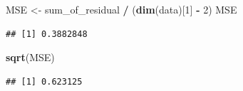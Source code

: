 \documentclass[]{article}
\newenvironment{Shaded}{\begin{snugshade}}{\end{snugshade}}
\newcommand{\KeywordTok}[1]{\textcolor[rgb]{0.13,0.29,0.53}{\textbf{#1}}}
\newcommand{\DecValTok}[1]{\textcolor[rgb]{0.00,0.00,0.81}{#1}}
\newcommand{\StringTok}[1]{\textcolor[rgb]{0.31,0.60,0.02}{#1}}
\newcommand{\OperatorTok}[1]{\textcolor[rgb]{0.81,0.36,0.00}{\textbf{#1}}}
\newcommand{\NormalTok}[1]{#1}
\begin{document}
\begin{Shaded}
\begin{Highlighting}[]
\NormalTok{MSE <-}\StringTok{ }\NormalTok{sum_of_residual }\OperatorTok{/}\StringTok{ }\NormalTok{(}\KeywordTok{dim}\NormalTok{(data)[}\DecValTok{1}\NormalTok{] }\OperatorTok{-}\StringTok{ }\DecValTok{2}\NormalTok{)}
\NormalTok{MSE}
\end{Highlighting}
\end{Shaded}

\begin{verbatim}
## [1] 0.3882848
\end{verbatim}

\begin{Shaded}
\begin{Highlighting}[]
\KeywordTok{sqrt}\NormalTok{(MSE)}
\end{Highlighting}
\end{Shaded}

\begin{verbatim}
## [1] 0.623125
\end{verbatim}
\end{document}
